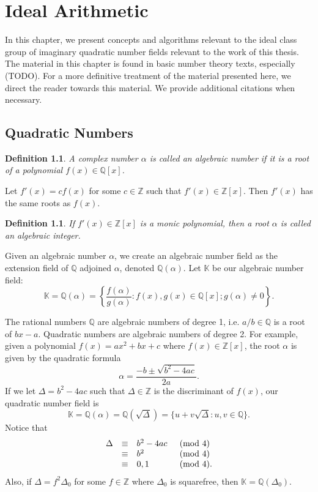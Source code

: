 \documentclass{ucalgthes1}
\newtheorem{defn}[thm]{Definition}
\newcommand{\KK}{\mathbb{K}}
\newcommand{\ZZ}{\mathbb{Z}}
\newcommand{\QQ}{\mathbb{Q}}
\begin{document}
\setcounter{chapter}{1}
\chapter{Ideal Arithmetic}

In this chapter, we present concepts and algorithms relevant to the ideal class group of imaginary quadratic number fields relevant to the work of this thesis.  The material in this chapter is found in basic number theory texts, especially (TODO).  For a more definitive treatment of the material presented here, we direct the reader towards this material.  We provide additional citations when necessary.  

\section{Quadratic Numbers}

\begin{defn}
A complex number $\alpha$ is called an \emph{algebraic number} if it is a root of a polynomial $f(x) \in \QQ[x]$.
\end{defn}
Let $f'(x) = cf(x)$ for some $c \in \ZZ$ such that $f'(x) \in \ZZ[x]$.  Then $f'(x)$ has the same roots as $f(x)$.  
\begin{defn}
If $f'(x) \in \ZZ[x]$ is a monic polynomial, then a root $\alpha$ is called an \emph{algebraic integer}. 
\end{defn}
Given an algebraic number $\alpha$, we create an algebraic number field as the extension field of $\QQ$ adjoined $\alpha$, denoted $\QQ(\alpha)$. Let $\KK$ be our algebraic number field:
\[
	\KK = \QQ(\alpha) = \left\{ \frac{f(\alpha)}{g(\alpha)} : f(x), g(x) \in \QQ[x]; g(\alpha) \ne 0 \right\}.
\]

\bigbreak
The rational numbers $\QQ$ are algebraic numbers of degree 1, i.e. $a/b \in \QQ$ is a root of $bx - a$.  Quadratic numbers are algebraic numbers of degree 2.  For example, given a polynomial $f(x) = ax^2 + bx + c$ where $f(x) \in \ZZ[x]$, the root $\alpha$ is given by the quadratic formula
\[
	\alpha = \frac{-b \pm \sqrt{b^2 - 4ac}}{2a}.
\]
If we let $\Delta = b^2 -4ac$ such that $\Delta \in \ZZ$ is the discriminant of $f(x)$, our quadratic number field is 
\[
	\KK = \QQ(\alpha) = \QQ(\sqrt{\Delta}) = \{u + v\sqrt{\Delta} : u,v \in \QQ\}.
\]
Notice that
\begin{eqnarray*}
\begin{array}{l l l l}
	\Delta & \equiv & b^2-4ac & \pmod 4 \\
	& \equiv & b^2 & \pmod 4 \\
	& \equiv & 0,1 & \pmod 4.
\end{array}
\end{eqnarray*}
Also, if $\Delta = f^2 \Delta_0$ for some $f \in \ZZ$ where $\Delta_0$ is squarefree, then $\KK = \QQ(\Delta_0)$.
\end{document}
